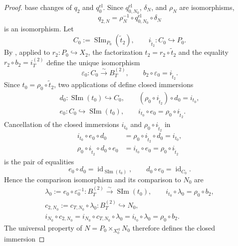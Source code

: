 \begin{proof}
  base changes of $q_2$ and $q_0^{\mathrm{el}}$.  Since
  $q^{\mathrm{el}}_{0,N_0}$, $\delta_N$, and $\rho_N$ are isomorphisms,
  \[
    q_{2,N}=\rho_N^{-1}\circ
      q^{\mathrm{el}}_{0,N_0}\circ\delta_N
  \]
  is an isomorphism.
  Let
  \[
    C_0:=\operatorname{SIm}_{P_0}(\widetilde t_2),
    \qquad
    i_{\widetilde t_2}\colon C_0\hookrightarrow P_0.
  \]
  By , applied to
  $r_2\colon P_0\hookrightarrow X_2$, the factorization
  $t_2=r_2\circ\widetilde t_2$ and the equality
  $r_2\circ b_2=i_T^{(2)}$ define the unique isomorphism
  \[
    \varepsilon_0\colon C_0\xrightarrow{\sim}B_T^{(2)},
    \qquad
    b_2\circ\varepsilon_0=i_{\widetilde t_2}.
  \]
  Since $t_0=\rho_0\circ\widetilde t_2$, two applications of
   define closed immersions
  \[
  \begin{gathered}
    d_0\colon\operatorname{SIm}(t_0)\hookrightarrow C_0,
    \qquad
    (\rho_0\circ i_{\widetilde t_2})\circ d_0=i_{t_0},\\
    e_0\colon C_0\hookrightarrow\operatorname{SIm}(t_0),
    \qquad
    i_{t_0}\circ e_0=\rho_0\circ i_{\widetilde t_2}.
  \end{gathered}
  \]
  Cancellation of the closed immersions $i_{t_0}$ and
  $\rho_0\circ i_{\widetilde t_2}$ in
  \[
  \begin{aligned}
    i_{t_0}\circ e_0\circ d_0
      &=\rho_0\circ i_{\widetilde t_2}\circ d_0=i_{t_0},\\
    \rho_0\circ i_{\widetilde t_2}\circ d_0\circ e_0
      &=i_{t_0}\circ e_0=\rho_0\circ i_{\widetilde t_2}
  \end{aligned}
  \]
  is the pair of equalities
  \[
    e_0\circ d_0=\operatorname{id}_{\operatorname{SIm}(t_0)},
    \qquad
    d_0\circ e_0=\operatorname{id}_{C_0}.
  \]
  Hence the comparison isomorphism and its comparison to $N_0$ are
  \[
  \begin{gathered}
    \lambda_0:=e_0\circ\varepsilon_0^{-1}
      \colon B_T^{(2)}\xrightarrow{\sim}\operatorname{SIm}(t_0),
    \qquad
    i_{t_0}\circ\lambda_0=\rho_0\circ b_2,\\
    c_{2,N_0}:=c_{T,N_0}\circ\lambda_0
      \colon B_T^{(2)}\hookrightarrow N_0,\\
    i_{N_0}\circ c_{2,N_0}
      =i_{N_0}\circ c_{T,N_0}\circ\lambda_0
      =i_{t_0}\circ\lambda_0
      =\rho_0\circ b_2.
  \end{gathered}
  \]
  The universal property of
  $N=P_0\times_{X_0^{\mathrm{el}}}N_0$ therefore defines the closed immersion

\end{proof}

